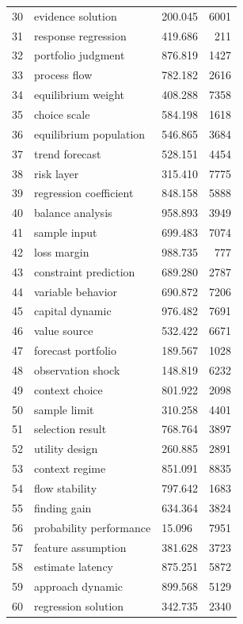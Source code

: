\documentclass[11pt]{report}
\begin{document}
\begin{longtable}{rllr}
30 & evidence solution & 200.045 & 6001 \\
31 & response regression & 419.686 & 211 \\
32 & portfolio judgment & 876.819 & 1427 \\
33 & process flow & 782.182 & 2616 \\
34 & equilibrium weight & 408.288 & 7358 \\
35 & choice scale & 584.198 & 1618 \\
36 & equilibrium population & 546.865 & 3684 \\
37 & trend forecast & 528.151 & 4454 \\
38 & risk layer & 315.410 & 7775 \\
39 & regression coefficient & 848.158 & 5888 \\
40 & balance analysis & 958.893 & 3949 \\
41 & sample input & 699.483 & 7074 \\
42 & loss margin & 988.735 & 777 \\
43 & constraint prediction & 689.280 & 2787 \\
44 & variable behavior & 690.872 & 7206 \\
45 & capital dynamic & 976.482 & 7691 \\
46 & value source & 532.422 & 6671 \\
47 & forecast portfolio & 189.567 & 1028 \\
48 & observation shock & 148.819 & 6232 \\
49 & context choice & 801.922 & 2098 \\
50 & sample limit & 310.258 & 4401 \\
51 & selection result & 768.764 & 3897 \\
52 & utility design & 260.885 & 2891 \\
53 & context regime & 851.091 & 8835 \\
54 & flow stability & 797.642 & 1683 \\
55 & finding gain & 634.364 & 3824 \\
56 & probability performance & 15.096 & 7951 \\
57 & feature assumption & 381.628 & 3723 \\
58 & estimate latency & 875.251 & 5872 \\
59 & approach dynamic & 899.568 & 5129 \\
60 & regression solution & 342.735 & 2340 \\
\end{longtable}
\end{document}
